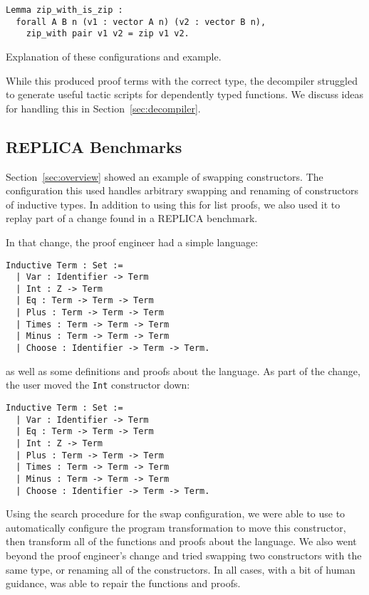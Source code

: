 \begin{lstlisting}
Lemma zip_with_is_zip :
  forall A B n (v1 : vector A n) (v2 : vector B n),
    zip_with pair v1 v2 = zip v1 v2.
\end{lstlisting}

Explanation of these configurations and example.

While this produced proof terms with the correct type, the decompiler struggled
to generate useful tactic scripts for dependently typed functions.
We discuss ideas for handling this in Section~\ref{sec:decompiler}.

\subsection{REPLICA Benchmarks}
\label{sec:replica}

Section~\ref{sec:overview} showed an example of swapping constructors.
The configuration this used handles arbitrary swapping and renaming of constructors of inductive types.
In addition to using this for list proofs, we also used it to replay part of a change found in
a REPLICA benchmark.

In that change, the proof engineer had a simple language:

\begin{lstlisting}
Inductive Term : Set :=
  | Var : Identifier -> Term
  | Int : Z -> Term
  | Eq : Term -> Term -> Term
  | Plus : Term -> Term -> Term
  | Times : Term -> Term -> Term
  | Minus : Term -> Term -> Term
  | Choose : Identifier -> Term -> Term.
\end{lstlisting}
as well as some definitions and proofs about the language.
As part of the change, the user moved the \lstinline{Int} constructor down:

\begin{lstlisting}
Inductive Term : Set :=
  | Var : Identifier -> Term
  | Eq : Term -> Term -> Term
  | Int : Z -> Term
  | Plus : Term -> Term -> Term
  | Times : Term -> Term -> Term
  | Minus : Term -> Term -> Term
  | Choose : Identifier -> Term -> Term.
\end{lstlisting}

Using the search procedure for the swap configuration, we were able to use \toolname
to automatically configure the program transformation to move this constructor,
then transform all of the functions and proofs about the language.
We also went beyond the proof engineer's change and tried swapping two constructors with the same type,
or renaming all of the constructors.
In all cases, with a bit of human guidance, \toolname was able to repair the functions and proofs.

